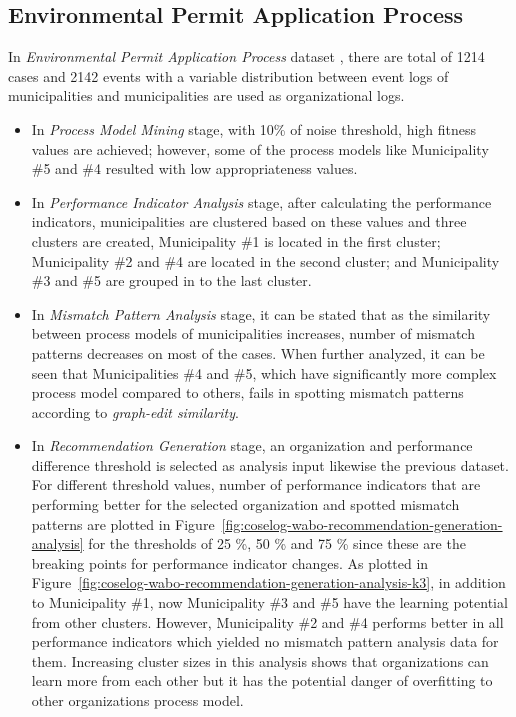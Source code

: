 \subsection{Environmental Permit Application Process}
\label{subsec:coselog-wabo-process}

In \textit{Environmental Permit Application Process} dataset \cite{coselog-data}, there are total of 1214 cases and 2142 events with a variable distribution between event logs of municipalities and municipalities are used as organizational logs.

\begin{itemize}
  \item In \textit{Process Model Mining} stage, with 10\% of noise threshold, high fitness values are achieved; however, some of the process models like Municipality \#5 and \#4 resulted with low appropriateness values. 
  \item In \textit{Performance Indicator Analysis} stage, after calculating the performance indicators, municipalities are clustered based on these values and three clusters are created, Municipality \#1 is located in the first cluster; Municipality \#2 and \#4 are located in the second cluster; and Municipality \#3 and \#5 are grouped in to the last cluster.
  \item In \textit{Mismatch Pattern Analysis} stage, it can be stated that as the similarity between process models of municipalities increases, number of mismatch patterns decreases on most of the cases. When further analyzed, it can be seen that Municipalities \#4 and \#5, which have significantly more complex process model compared to others, fails in spotting mismatch patterns according to \textit{graph-edit similarity}.
  \item In \textit{Recommendation Generation} stage, an organization and performance difference threshold is selected as analysis input likewise the previous dataset. For different threshold values, number of performance indicators that are performing better for the selected organization and spotted mismatch patterns are plotted in Figure~\ref{fig:coselog-wabo-recommendation-generation-analysis} for the thresholds of 25 \%, 50 \% and 75 \% since these are the breaking points for performance indicator changes. As plotted in Figure~\ref{fig:coselog-wabo-recommendation-generation-analysis-k3}, in addition to Municipality \#1, now Municipality \#3 and \#5 have the learning potential from other clusters. However, Municipality \#2 and \#4 performs better in all performance indicators which yielded no mismatch pattern analysis data for them. Increasing cluster sizes in this analysis shows that organizations can learn more from each other but it has the potential danger of overfitting to other organizations process model. 

\end{itemize}
